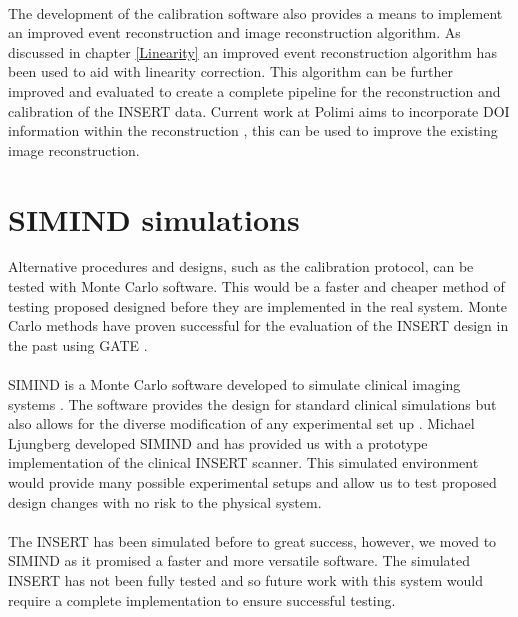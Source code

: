 \paragraph{}
The development of the calibration software also provides a means to implement an improved event reconstruction and image reconstruction algorithm. As discussed in chapter \ref{Linearity} an improved event reconstruction algorithm has been used to aid with linearity correction. This algorithm can be further improved and evaluated to create a complete pipeline for the reconstruction and calibration of the \acrshort{INSERT} data. Current work at Polimi aims to incorporate \acrshort{DOI} information within the reconstruction \cite{MASSARA2018ProcessingSystem}, this can be used to improve the existing image reconstruction. 

\section{SIMIND simulations}
Alternative procedures and designs, such as the calibration protocol, can be tested with Monte Carlo software. This would be a faster and cheaper method of testing proposed designed before they are implemented in the real system. Monte Carlo methods have proven successful for the evaluation of the \acrshort{INSERT} design in the past using GATE \cite{1236960} \cite{Busca2014SimulationImaging}.
\paragraph{}
SIMIND is a Monte Carlo software developed to simulate clinical imaging systems \cite{LJUNGBERG1989257}. The software provides the design for standard clinical simulations but also allows for the diverse modification of any experimental set up \cite{Gustafsson2018MonteFramework}. Michael Ljungberg developed SIMIND and has provided us with a prototype implementation of the clinical \acrshort{INSERT} scanner. This simulated environment would provide many possible experimental setups and allow us to test proposed design changes with no risk to the physical system. 
\paragraph{}
The \acrshort{INSERT} has been simulated before to great success, however, we moved to SIMIND as it promised a faster and more versatile software. The simulated \acrshort{INSERT} has not been fully tested and so future work with this system would require a complete implementation to ensure successful testing. 
